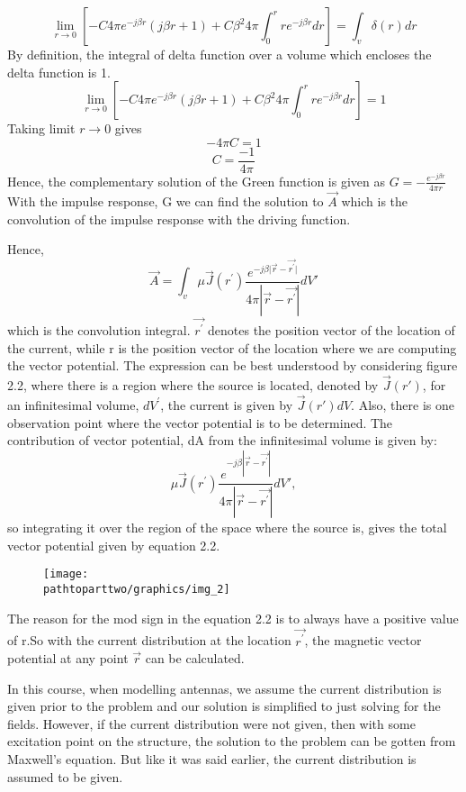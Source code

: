 \begin{dmath*}
\lim\limits_{r\rightarrow0} \left[-C4\pi e^{-j\beta r}(j\beta r+1) + C\beta^{2}4\pi\int_{0}^{r}re^{-j\beta r}dr\right] = \int_{v}\delta(r)dr
\end{dmath*}
By definition, the integral of delta function over a volume which encloses the delta function is 1.
$$\lim\limits_{r\rightarrow0} \left[-C4\pi e^{-j\beta r}(j\beta r+1) + C\beta^{2}4\pi\int_{0}^{r}re^{-j\beta r}dr\right] = 1$$
Taking limit $r\rightarrow0$ gives
$$-4\pi C= 1$$
$$C = \frac{-1}{4\pi}$$
Hence, the complementary solution of the Green function is given as $ G= -\frac{e^{-j\beta r}}{4\pi r}$
With the impulse response, G we can find the solution to $\vec{A}$ which is the convolution of the impulse response with the driving function.

Hence, 
\begin{equation}
\vec{A}=\int_{v}\mu\vec{J}(r^{'}) \frac{e^{-j\beta\vert\vec{r}-\vec{r^{'}}\vert}}{4\pi|\vec{r}-\vec{r^{'}}|}dV'
\end{equation}
which is the convolution integral. $\vec{r^{'}}$ denotes the position vector of the location of the current, while r is the position vector of the location where we are computing the vector potential. The expression can be best understood by considering figure 2.2, where there is a region where the source is located, denoted by $\vec{J}(r')$, for an infinitesimal volume, $dV^{'}$, the current is given by $\vec{J}(r')dV$. Also, there is one observation point where the vector potential is to be determined. The contribution of vector potential, dA from the infinitesimal volume is given by: 
\begin{equation}
\mu\vec{J}(r^{'}) \frac{e^{-j\beta|\vec{r}-\vec{r^{'}}|}}{4\pi|\vec{r}-\vec{r^{'}}|}dV',
\end{equation}
so integrating it over the region of the space where the source is, gives the total vector potential given by equation 2.2.
\begin{figure}[h]
\centering
\texttt{[image: \\pathtoparttwo/graphics/img\_2]}
\label{fig:1}
\end{figure}
The reason for the mod sign in the equation 2.2 is to always have a positive value of r.So with the current distribution at the location $\vec{r^{'}}$, the magnetic vector potential at any point $\vec{r}$ can be calculated.

In this course, when modelling antennas, we assume the current distribution is given prior to the problem and our solution is simplified to just solving for the fields. However, if the current distribution were not given, then with some excitation point on the structure, the solution to the problem can be gotten from Maxwell's equation. But like it was said earlier, the current distribution is assumed to be given.